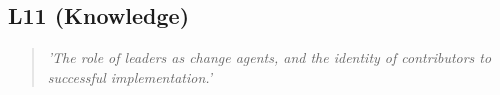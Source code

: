 \subsection{L11 (Knowledge)}

  \begin{quote}
    \textit{'The role of leaders as change agents,
    and the identity of contributors to successful
    implementation.'}
  \end{quote}

\newpage
